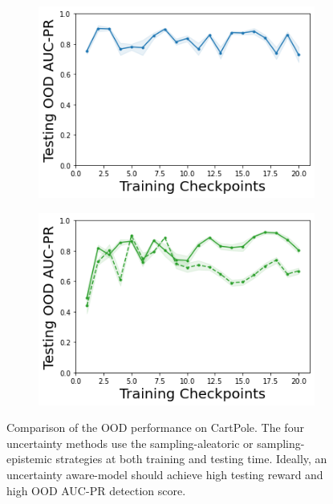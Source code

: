 \begin{figure}
\begin{subfigure}{.245\textwidth}
    \end{subfigure}
    \begin{subfigure}{.245\textwidth}
        \includegraphics[width=\textwidth]{sections/011_icml2022/resources/DKL-CartPoleOOD-v0-AUC-PR-out-epistemic_-testing-strategy.png}
    \end{subfigure}
    \begin{subfigure}{.245\textwidth}
        \includegraphics[width=\textwidth]{sections/011_icml2022/resources/PostNet-CartPoleOOD-v0-AUC-PR-out-epistemic_-testing-strategy.png}
    \end{subfigure}
        \vspace{-3mm}
    \caption{Comparison of the OOD performance on CartPole. The four uncertainty methods use the sampling-aleatoric or sampling-epistemic strategies at both training and testing time. Ideally, an uncertainty aware-model should achieve high testing reward and high OOD AUC-PR detection score.}
    \label{fig:strategy-testing-ood-auc-pr-performance-cartpole}
        \vspace{-3mm}
\end{figure}